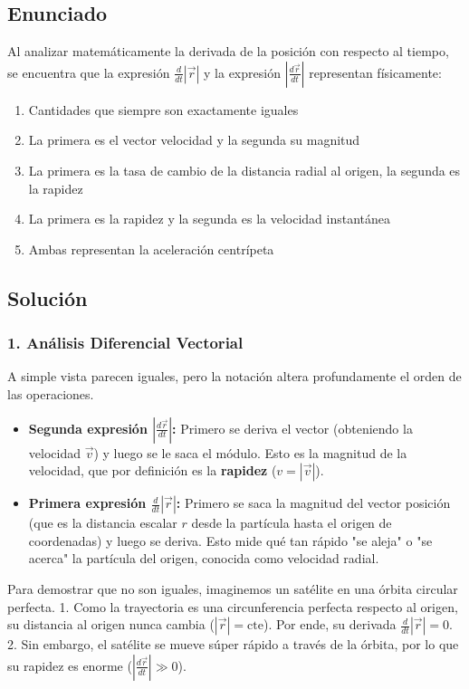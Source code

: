 \documentclass[12pt, a4paper]{article}
\begin{document}
\newpage

\subsection*{Enunciado}
Al analizar matemáticamente la derivada de la posición con respecto al tiempo, se encuentra que la expresión $\frac{d}{dt} |\vec{r}|$ y la expresión $\left|\frac{d\vec{r}}{dt}\right|$ representan físicamente:
\begin{enumerate}[label=\alph*)]
    \item Cantidades que siempre son exactamente iguales
    \item La primera es el vector velocidad y la segunda su magnitud
    \item La primera es la tasa de cambio de la distancia radial al origen, la segunda es la rapidez
    \item La primera es la rapidez y la segunda es la velocidad instantánea
    \item Ambas representan la aceleración centrípeta
\end{enumerate}

\subsection*{Solución}

\subsubsection*{1. Análisis Diferencial Vectorial}
A simple vista parecen iguales, pero la notación altera profundamente el orden de las operaciones.
\begin{itemize}
    \item \textbf{Segunda expresión $\left|\frac{d\vec{r}}{dt}\right|$:} Primero se deriva el vector (obteniendo la velocidad $\vec{v}$) y luego se le saca el módulo. Esto es la magnitud de la velocidad, que por definición es la \textbf{rapidez} ($v = |\vec{v}|$).
    \item \textbf{Primera expresión $\frac{d}{dt} |\vec{r}|$:} Primero se saca la magnitud del vector posición (que es la distancia escalar $r$ desde la partícula hasta el origen de coordenadas) y luego se deriva. Esto mide qué tan rápido "se aleja" o "se acerca" la partícula del origen, conocida como velocidad radial.
\end{itemize}

Para demostrar que no son iguales, imaginemos un satélite en una órbita circular perfecta. 
1. Como la trayectoria es una circunferencia perfecta respecto al origen, su distancia al origen nunca cambia ($|\vec{r}| = \text{cte}$). Por ende, su derivada $\frac{d}{dt} |\vec{r}| = 0$.
2. Sin embargo, el satélite se mueve súper rápido a través de la órbita, por lo que su rapidez es enorme ($\left|\frac{d\vec{r}}{dt}\right| \gg 0$).
\end{document}
